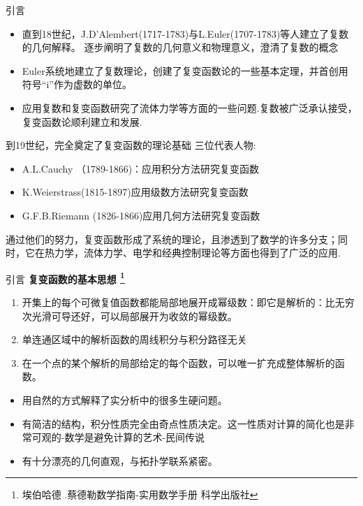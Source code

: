 \documentclass{beamer}
\begin{document}
\begin{frame}{引言}

\begin{itemize}
    \item 
      直到18世纪，J.D’Alembert(1717-1783)与L.Euler(1707-1783)等人建立了复数的几何解释。
逐步阐明了复数的几何意义和物理意义，澄清了复数的概念    
     \item
        Euler系统地建立了复数理论，创建了复变函数论的一些基本定理，并首创用符号“i”作为虚数的单位。
     \item
     应用复数和复变函数研究了流体力学等方面的一些问题.复数被广泛承认接受，复变函数论顺利建立和发展.

\end{itemize}
    到19世纪，完全奠定了复变函数的理论基础
三位代表人物:
\begin{itemize}
    \item A.L.Cauchy （1789-1866)：应用积分方法研究复变函数
 \item
 K.Weierstrass(1815-1897)应用级数方法研究复变函数
 \item
 G.F.B.Riemann (1826-1866)应用几何方法研究复变函数
\end{itemize}
 通过他们的努力，复变函数形成了系统的理论，且渗透到了数学的许多分支；同时，它在热力学，流体力学、电学和经典控制理论等方面也得到了广泛的应用.

\end{frame}
%
%
\begin{frame}{引言}
\textbf{复变函数的基本思想 \footnote{ 埃伯哈德 .蔡德勒\quad 数学指南-实用数学手册 \quad 科学出版社}}
\begin{enumerate}
    \item 开集上的每个可微复值函数都能局部地展开成幂级数：即它是解析的：比无穷次光滑可导还好，可以局部展开为收敛的幂级数。
    \item  单连通区域中的解析函数的周线积分与积分路径无关
    \item 在一个点的某个解析的局部给定的每个函数，可以唯一扩充成整体解析的函数。
\end{enumerate}
\begin{itemize}
    \item 用自然的方式解释了实分析中的很多生硬问题。
    \item 有简洁的结构，积分性质完全由奇点性质决定。这一性质对计算的简化也是非常可观的-数学是避免计算的艺术-民间传说
    \item 有十分漂亮的几何直观，与拓扑学联系紧密。
\end{itemize}

\end{frame}
\end{document}
